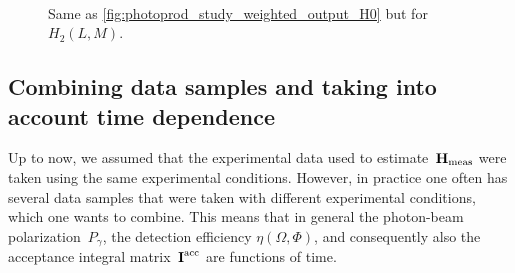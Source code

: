 \begin{figure}[tbp]
  \centering%
  \\%
  \caption{Same as \cref{fig:photoprod_study_weighted_output_H0} but
  for $H_2(L, M)$.}%
  \label{fig:photoprod_study_weighted_output_H2}%
\end{figure}


\clearpage
\subsection{Combining data samples and taking into account time dependence}%
\label{sec:photoprod:comb_data}

Up to now, we assumed that the experimental data used to
estimate~$\bm{\mathrm{H}}_\text{meas}$ were taken using the same experimental
conditions.  However, in practice one often has several data samples
that were taken with different experimental conditions, which one
wants to combine.  This means that in general the photon-beam
polarization~$P_\gamma$, the detection efficiency $\eta(\Omega,
\Phi)$, and consequently also the acceptance integral
matrix~$\bm{\mathrm{I}}^\text{acc}$ are functions of time.

